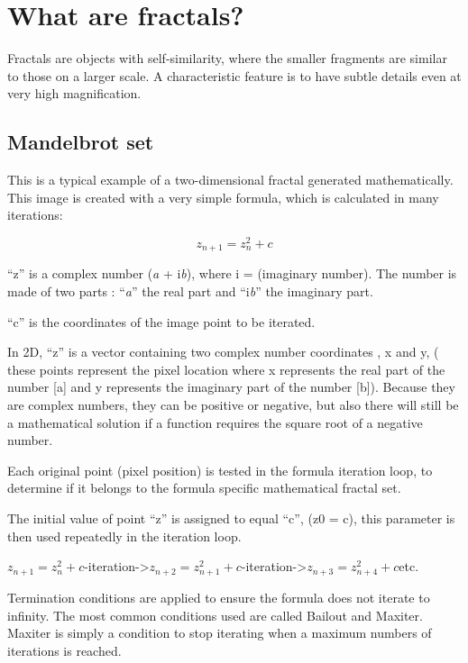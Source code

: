 \section{What are fractals?}\label{what-are-fractals}

Fractals are objects with self-similarity, where the smaller fragments
are similar to those on a larger scale. A characteristic feature is to
have subtle details even at very high magnification.

\subsection{Mandelbrot set}\label{mandelbrot-set}

This is a typical example of a two-dimensional fractal generated
mathematically. This image is created with a very simple formula, which
is calculated in many iterations:

\[z_{n + 1} = z_{n}^{2} + c\]

``z'' is a complex number (\emph{a} + i\emph{b}), where i = (imaginary
number). The number is made of two parts : ``\emph{a}'' the real part
and ``i\emph{b}'' the imaginary part.

``c'' is the coordinates of the image point to be iterated.

In 2D, ``z'' is a vector containing two complex number coordinates , x
and y, ( these points represent the pixel location where x represents
the real part of the number {[}a{]} and y represents the imaginary part
of the number {[}b{]}). Because they are complex numbers, they can be
positive or negative, but also there will still be a mathematical
solution if a function requires the square root of a negative number.

Each original point (pixel position) is tested in the formula iteration
loop, to determine if it belongs to the formula specific mathematical
fractal set.

The initial value of point ``z'' is assigned to equal ``c'', (z0 = c),
this parameter is then used repeatedly in the iteration loop.

\(z_{n + 1} = z_{n}^{2} + c\)-iteration-\textgreater{}\(z_{n + 2} = z_{n + 1}^{2} + c\)-iteration-\textgreater{}\(z_{n + 3} = z_{n + 4}^{2} + c\)etc.

Termination conditions are applied to ensure the formula does not
iterate to infinity. The most common conditions used are called Bailout
and Maxiter. Maxiter is simply a condition to stop iterating when a
maximum numbers of iterations is reached.

